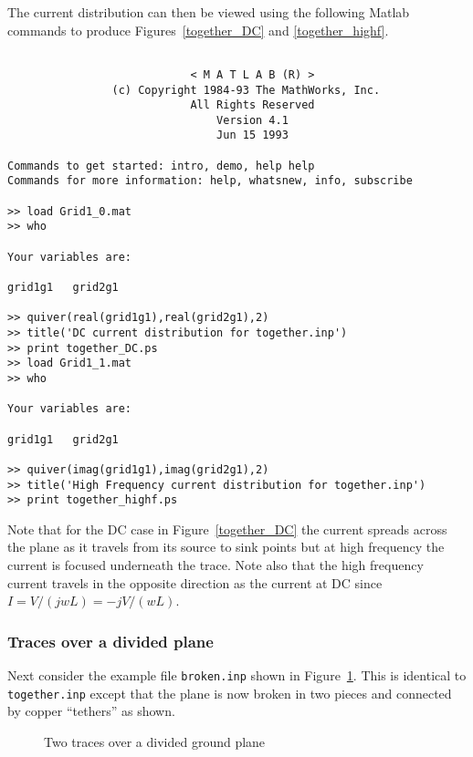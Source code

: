 The current distribution can then be viewed using the following
Matlab commands to produce Figures~\ref{together_DC} and
\ref{together_highf}.
\begin{verbatim}

                            < M A T L A B (R) >
                (c) Copyright 1984-93 The MathWorks, Inc.
                            All Rights Reserved
                                Version 4.1
                                Jun 15 1993

Commands to get started: intro, demo, help help
Commands for more information: help, whatsnew, info, subscribe

>> load Grid1_0.mat
>> who

Your variables are:

grid1g1   grid2g1

>> quiver(real(grid1g1),real(grid2g1),2)
>> title('DC current distribution for together.inp')
>> print together_DC.ps
>> load Grid1_1.mat
>> who

Your variables are:

grid1g1   grid2g1

>> quiver(imag(grid1g1),imag(grid2g1),2)
>> title('High Frequency current distribution for together.inp')
>> print together_highf.ps

\end{verbatim}

Note that for the DC case in Figure~\ref{together_DC} the current
spreads across the plane as it travels from its source to sink points
but at high frequency the current is focused underneath the trace.
Note also that the high frequency current travels in the 
opposite direction as the current at DC since $I = V/(j w L) = - j V/(w L)$.

\subsubsection{Traces over a divided plane}
Next consider the example file {\tt broken.inp} shown in
Figure~\ref{broken}.  This is identical to {\tt together.inp} except
that the plane is now broken in two pieces and connected by copper
``tethers'' as shown.  

\begin{figure}
\centerline{
}
\caption{Two traces over a divided ground plane}
\label{broken}
\end{figure}

\begin{figure}
\centerline{
}
\caption{}
\label{broken_DC}
\end{figure}

